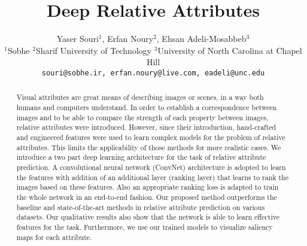 \documentclass[10pt,twocolumn,letterpaper]{article}
\begin{document}
\title{Deep Relative Attributes}

\author{Yaser Souri$^1$, Erfan Noury$^2$, Ehsan Adeli-Mosabbeb$^3$\\
$^1$Sobhe \quad $^2$Sharif University of Technology \quad $^3$University of North Carolina at Chapel Hill\\
{\tt\small souri@sobhe.ir, erfan.noury@live.com, eadeli@unc.edu}
}

\maketitle

\begin{abstract}
Visual attributes are great means of describing images or scenes, in a way both humans and computers understand. In order to establish a correspondence between images and to be able to compare the strength of each property between images, relative attributes were introduced. However, since their introduction, hand-crafted and engineered features were used to learn complex models for the problem of relative attributes. This limits the applicability of those methods for more realistic cases. We introduce a two part deep learning architecture for the task of relative attribute prediction. A convolutional neural network (ConvNet) architecture is adopted to learn the features with addition of an additional layer (ranking layer) that learns to rank the images based on these features. Also an appropriate ranking loss is adapted to train the whole network in an end-to-end fashion. Our proposed method outperforms the baseline and state-of-the-art methods in relative attribute prediction on various datasets. Our qualitative results also show that the network is able to learn effective features for the task. Furthermore, we use our trained models to visualize saliency maps for each attribute.
\end{abstract}








{\small


}
\end{document}
